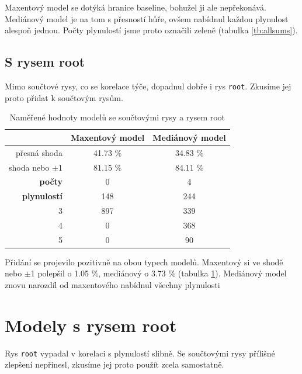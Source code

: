 \documentclass[12pt,a4paper]{report}
\begin{document}
Maxentový model se dotýká hranice baseline, bohužel ji ale nepřekonává. Mediánový model je na tom s přesností hůře, ovšem nabídnul každou plynulost alespoň jednou. Počty plynulostí jsme proto označili zeleně (tabulka \ref{tb:allsums}).

\subsection{S rysem root}
Mimo součtové rysy, co se korelace týče, dopadnul dobře i rys \texttt{root}. Zkusíme jej proto přidat k součtovým rysům.

\begin{table}[!htbp]
\begin{center}
\begin{tabular}{|r|c|c|}
\hline
 & \textbf{Maxentový model} & \textbf{Mediánový model} \\
 \hline
přesná shoda & 41.73 \%  & 34.83 \%  \\
\hline
shoda nebo $\pm$1 & 81.15 \% & 84.11 \%  \\
\hline
     \textbf{počty} \quad 1 & \color{red}0   & \color{OliveGreen}4   \\
\textbf{plynulostí} \quad 2 & 148 & \color{OliveGreen}244   \\
                          3 & 897 & \color{OliveGreen}339 \\
                          4 & \color{red}0   & \color{OliveGreen}368 \\
                          5 & \color{red}0   & \color{OliveGreen}90  \\
\hline
\end{tabular}
\caption{Naměřené hodnoty modelů se součtovými rysy a rysem root}\label{tb:allsumsroot}
\end{center}
\end{table}

Přidání se projevilo pozitivně na obou typech modelů. Maxentový si ve shodě nebo $\pm$1 polepšil o 1.05 \%, mediánový o 3.73 \% (tabulka \ref{tb:allsumsroot}). Mediánový model znovu narozdíl od maxentového nabídnul všechny plynulosti


\section{Modely s rysem root}
Rys \texttt{root} vypadal v korelaci s plynulostí slibně. Se součtovými rysy přílišné zlepšení nepřinesl, zkusíme jej proto použít zcela samostatně.
\end{document}
